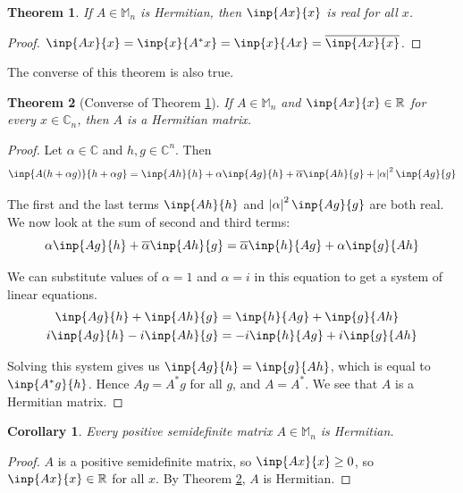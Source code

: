 \documentclass[twoside]{article}
\newcommand*\conj[1]{\overline{#1}}
\newcommand*\adj[1]{#1^*}
\newcommand*\abs[1]{\left \vert #1 \right\vert}
\theoremstyle{plain}
\newtheorem{theorem}{Theorem}
\newtheorem*{corollary}{Corollary}
\theoremstyle{definition}
\theoremstyle{remark}
\begin{document}
\begin{theorem} \label{hermit_real} If \(A \in \mathbb{M}_n\) is Hermitian, then \(\inp{Ax}{x}\) is real for all \(x\). \end{theorem}
\begin{proof} \(\inp{Ax}{x} = \inp{x}{\adj{A}x} = \inp{x}{Ax} = \conj{\inp{Ax}{x}}\). \end{proof}

The converse of this theorem is also true.

\begin{theorem}[Converse of Theorem \ref{hermit_real}]\label{eig_real_herm} If \(A \in \mathbb{M}_n\) and \(\inp{Ax}{x} \in \mathbb{R}\) for every \(x \in \mathbb{C}_n\), then \(A\) is a Hermitian matrix. \end{theorem}

\begin{proof} Let \(\alpha \in \mathbb{C}\) and \(h, g \in \mathbb{C}^n\). Then
\[\inp{A(h + \alpha g)}{h + \alpha g} = \inp{Ah}{h} + \alpha \inp{Ag}{h} + \conj{\alpha} \inp{Ah}{g} + \abs{\alpha}^2 \inp{Ag}{g} \]

The first and the last terms \(\inp{Ah}{h}\) and \(\abs{\alpha}^2 \inp{Ag}{g}\) are both real. We now look at the sum of second and third terms:
\[\alpha \inp{Ag}{h} + \conj{\alpha} \inp{Ah}{g} = \conj{\alpha} \inp{h}{Ag} + \alpha \inp{g}{Ah} \]

We can substitute values of \(\alpha = 1\) and \(\alpha = i\)  in this equation to get a system of linear equations. 
\begin{equation*}
\begin{aligned}
\inp{Ag}{h}  + \inp{Ah}{g} & =  \inp{h}{Ag}  + \inp{g}{Ah} \\
i \inp{Ag}{h}  - i \inp{Ah}{g}  & = -i \inp{h}{Ag} +  i \inp{g}{Ah} 
\end{aligned}
\end{equation*}

Solving this system gives us \(\inp{Ag}{h} = \inp{g}{Ah}\), which is equal to \(\inp{\adj{A}g}{h}\). Hence \(Ag = \adj{A}g\) for all \(g\), and \(A = \adj{A}\). We see that \(A\) is a Hermitian matrix.
\end{proof}

\begin{corollary}Every positive semidefinite matrix \(A \in \mathbb{M}_n\) is Hermitian.\end{corollary}
\begin{proof} \(A\) is a positive semidefinite matrix, so \(\inp{Ax}{x} \ge 0 \),  so \(\inp{Ax}{x} \in \mathbb{R}\) for all \(x\). By Theorem \ref{eig_real_herm}, \(A\) is Hermitian. \end{proof}
\end{document}
